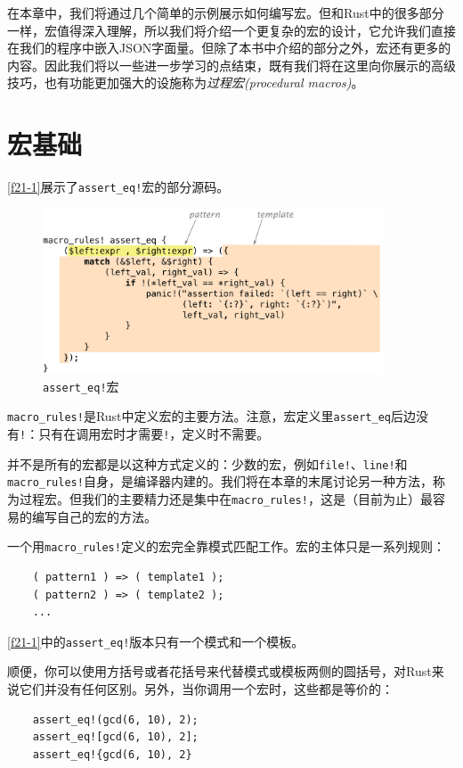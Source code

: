 在本章中，我们将通过几个简单的示例展示如何编写宏。但和Rust中的很多部分一样，宏值得深入理解，所以我们将介绍一个更复杂的宏的设计，它允许我们直接在我们的程序中嵌入JSON字面量。但除了本书中介绍的部分之外，宏还有更多的内容。因此我们将以一些进一步学习的点结束，既有我们将在这里向你展示的高级技巧，也有功能更加强大的设施称为\emph{过程宏(procedural macros)}。

\section{宏基础}
\autoref{f21-1}展示了\texttt{assert\_eq!}宏的部分源码。

\begin{figure}[htbp]
    \centering
    \includegraphics[width=0.9\textwidth]{../img/f21-1.png}
    \caption{\texttt{assert\_eq!}宏}
    \label{f21-1}
\end{figure}

\texttt{macro\_rules!}是Rust中定义宏的主要方法。注意，宏定义里\texttt{assert\_eq}后边没有\texttt{!}：只有在调用宏时才需要\texttt{!}，定义时不需要。

并不是所有的宏都是以这种方式定义的：少数的宏，例如\texttt{file!}、\texttt{line!}和\texttt{macro\_rules!}自身，是编译器内建的。我们将在本章的末尾讨论另一种方法，称为过程宏。但我们的主要精力还是集中在\texttt{macro\_rules!}，这是（目前为止）最容易的编写自己的宏的方法。

一个用\texttt{macro\_rules!}定义的宏完全靠模式匹配工作。宏的主体只是一系列规则：
\begin{verbatim}
    ( pattern1 ) => ( template1 );
    ( pattern2 ) => ( template2 );
    ...
\end{verbatim}

\autoref{f21-1}中的\texttt{assert\_eq!}版本只有一个模式和一个模板。

顺便，你可以使用方括号或者花括号来代替模式或模板两侧的圆括号，对Rust来说它们并没有任何区别。另外，当你调用一个宏时，这些都是等价的：
\begin{verbatim}
    assert_eq!(gcd(6, 10), 2);
    assert_eq![gcd(6, 10), 2];
    assert_eq!{gcd(6, 10), 2}
\end{verbatim}


